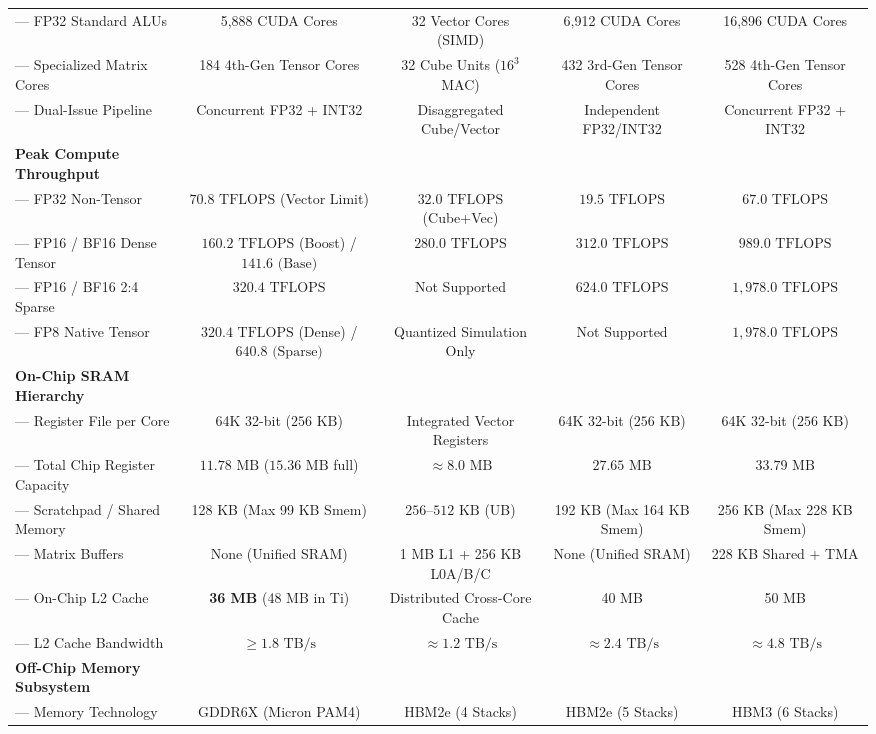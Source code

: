 \begin{table}[t]
{\begin{tabular}{lcccc}
--- FP32 Standard ALUs & 5,888 CUDA Cores & 32 Vector Cores (SIMD) & 6,912 CUDA Cores & 16,896 CUDA Cores \\
--- Specialized Matrix Cores & 184 4th-Gen Tensor Cores & 32 Cube Units ($16^3$ MAC) & 432 3rd-Gen Tensor Cores & 528 4th-Gen Tensor Cores \\
--- Dual-Issue Pipeline & Concurrent FP32 + INT32 & Disaggregated Cube/Vector & Independent FP32/INT32 & Concurrent FP32 + INT32 \\
\midrule
\textbf{Peak Compute Throughput} & & & & \\
--- FP32 Non-Tensor & $70.8\text{ TFLOPS}$ (Vector Limit) & $32.0\text{ TFLOPS}$ (Cube+Vec) & $19.5\text{ TFLOPS}$ & $67.0\text{ TFLOPS}$ \\
--- FP16 / BF16 Dense Tensor & $160.2\text{ TFLOPS}$ (Boost) / $141.6\text{ (Base)}$ & $280.0\text{ TFLOPS}$ & $312.0\text{ TFLOPS}$ & $989.0\text{ TFLOPS}$ \\
--- FP16 / BF16 2:4 Sparse & $320.4\text{ TFLOPS}$ & Not Supported & $624.0\text{ TFLOPS}$ & $1,978.0\text{ TFLOPS}$ \\
--- FP8 Native Tensor & $320.4\text{ TFLOPS}$ (Dense) / $640.8\text{ (Sparse)}$ & Quantized Simulation Only & Not Supported & $1,978.0\text{ TFLOPS}$ \\
\midrule
\textbf{On-Chip SRAM Hierarchy} & & & & \\
--- Register File per Core & 64K 32-bit ($256\text{ KB}$) & Integrated Vector Registers & 64K 32-bit ($256\text{ KB}$) & 64K 32-bit ($256\text{ KB}$) \\
--- Total Chip Register Capacity & $11.78\text{ MB}$ ($15.36\text{ MB}$ full) & $\approx 8.0\text{ MB}$ & $27.65\text{ MB}$ & $33.79\text{ MB}$ \\
--- Scratchpad / Shared Memory & 128 KB (Max 99 KB Smem) & $256\text{--}512\text{ KB}$ (UB) & 192 KB (Max 164 KB Smem) & 256 KB (Max 228 KB Smem) \\
--- Matrix Buffers & None (Unified SRAM) & 1 MB L1 + 256 KB L0A/B/C & None (Unified SRAM) & 228 KB Shared + TMA \\
--- On-Chip L2 Cache & \textbf{36 MB} (48 MB in Ti) & Distributed Cross-Core Cache & 40 MB & 50 MB \\
--- L2 Cache Bandwidth & $\ge 1.8\text{ TB/s}$ & $\approx 1.2\text{ TB/s}$ & $\approx 2.4\text{ TB/s}$ & $\approx 4.8\text{ TB/s}$ \\
\midrule
\textbf{Off-Chip Memory Subsystem} & & & & \\
--- Memory Technology & GDDR6X (Micron PAM4) & HBM2e (4 Stacks) & HBM2e (5 Stacks) & HBM3 (6 Stacks) \\

\end{tabular}}
\end{table}
